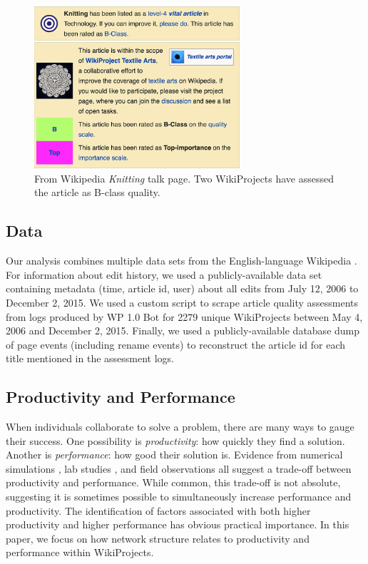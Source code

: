 \begin{figure}[t!]
\begin{center}
\includegraphics[width=3in]{fig/WPProdPerf/fig-knitting.png}
\caption{
From Wikipedia {\em Knitting} talk page.
Two WikiProjects have assessed the article as B-class quality.
\label{fig:knitting}
}
\end{center}
\end{figure}

\subsection{Data}

Our analysis combines multiple data
sets from the English-language Wikipedia \cite{platt_english_2018}.
For information about edit history, we used a publicly-available data set containing
metadata (time, article id, user) about all edits from July 12, 2006 to December 2, 2015.
We used a custom script to scrape article quality assessments from logs produced
by WP 1.0 Bot for 2279 unique WikiProjects
between May 4, 2006 and December 2, 2015.
Finally, we used a publicly-available database dump of page events (including rename events)
to reconstruct the article id for each title mentioned in the assessment logs.

\subsection{Productivity and Performance}

When individuals collaborate to solve a problem,
there are many ways to gauge their success.
One possibility is {\em productivity}:
how quickly they find a solution.
Another is {\em performance}:
how good their solution is.
Evidence from numerical simulations
\cite{lazer_network_2007,mason_propagation_2008,mason_collaborative_2012,grim_scientific_2013,barkoczi_social_2016},
lab studies \cite{kearns_experiments_2012},
and field observations \cite{gentry_consensus_1982}
all suggest a trade-off between productivity and performance.
While common, this trade-off is not absolute,
suggesting it is sometimes possible to simultaneously increase
performance and productivity.
The identification of factors associated with both higher productivity
and higher performance has obvious practical importance.
In this paper, we focus on how network structure
relates to productivity and performance within WikiProjects.

